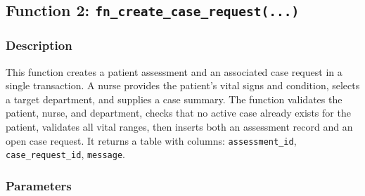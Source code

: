\documentclass{article}
\begin{document}
\vspace{1em}



\subsection{Function 2: \texttt{fn\_create\_case\_request(...)}}

\subsubsection{Description}
This function creates a patient assessment and an associated case request in a single transaction. A nurse provides the patient's vital signs and condition, selects a target department, and supplies a case summary. The function validates the patient, nurse, and department, checks that no active case already exists for the patient, validates all vital ranges, then inserts both an assessment record and an open case request. It returns a table with columns: \texttt{assessment\_id}, \texttt{case\_request\_id}, \texttt{message}.

\subsubsection{Parameters}
\end{document}
